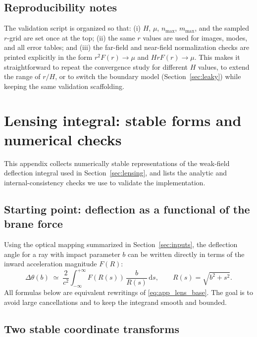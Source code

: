 \documentclass[11pt]{article}
\newcommand{\dd}{\mathrm{d}}
\begin{document}
\subsection{Reproducibility notes}

The validation script is organized so that:
(i) $H$, $\mu$, $n_{\max}$, $m_{\max}$, and the sampled $r$-grid are set once at the top;
(ii) the same $r$ values are used for images, modes, and all error tables; and
(iii) the far-field and near-field normalization checks are printed explicitly in the form
$r^2F(r)\to\mu$ and $HrF(r)\to\mu$.
This makes it straightforward to repeat the convergence study for different $H$ values, to extend the
range of $r/H$, or to switch the boundary model (Section~\ref{sec:leaky}) while keeping the same
validation scaffolding.

\section{Lensing integral: stable forms and numerical checks}
\label{app:lensing}

This appendix collects numerically stable representations of the weak-field deflection integral used
in Section~\ref{sec:lensing}, and lists the analytic and internal-consistency checks we use to
validate the implementation.

\subsection{Starting point: deflection as a functional of the brane force}

Using the optical mapping summarized in Section~\ref{sec:inputs}, the deflection angle for a ray
with impact parameter $b$ can be written directly in terms of the inward acceleration magnitude
$F(R)$:
\begin{equation}
  \Delta\theta(b)
  \;\simeq\;
  \frac{2}{c^2}\int_{-\infty}^{+\infty}
  F\!\left(R(s)\right)\,\frac{b}{R(s)}\,\dd s,
  \qquad
  R(s)=\sqrt{b^2+s^2}.
  \label{eq:app_lens_base}
\end{equation}
All formulas below are equivalent rewritings of \eqref{eq:app_lens_base}.  The goal is to avoid
large cancellations and to keep the integrand smooth and bounded.

\subsection{Two stable coordinate transforms}
\end{document}
